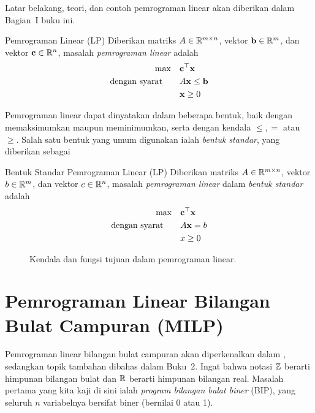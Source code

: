 Latar belakang, teori, dan contoh pemrograman linear akan diberikan dalam Bagian~I buku ini.
\begin{general}{Pemrograman Linear (LP)}{\polynomial}
\label{general:LP}
Diberikan matriks $A \in {\mathbb{R}}^{m\times n}$, vektor $\mathbf{b} \in {\mathbb{R}}^m$, dan vektor $\mathbf{c} \in {\mathbb{R}}^n$, masalah \emph{pemrograman linear} adalah
\begin{equation}
\label{eq:LP}
\begin{split}
\max \quad & \mathbf{c}^\top \mathbf{x}\\
\mbox{dengan syarat}\quad  \quad & A\mathbf{x} \leq \mathbf{b}\\
& \mathbf{x} \geq 0
\end{split}
\end{equation}
\end{general}

Pemrograman linear dapat dinyatakan dalam beberapa bentuk, baik dengan memaksimumkan maupun meminimumkan, serta dengan kendala $\leq, =$ atau $\geq$. Salah satu bentuk yang umum digunakan ialah \emph{bentuk standar}, yang diberikan sebagai
\begin{general}{Bentuk Standar Pemrograman Linear (LP)}{\polynomial}
Diberikan matriks $A \in {\mathbb{R}}^{m\times n}$, vektor $b \in {\mathbb{R}}^m$, dan vektor $c \in {\mathbb{R}}^n$, masalah \emph{pemrograman linear} dalam \emph{bentuk standar} adalah
\begin{equation}
\label{eq:standardLP}
\begin{split}
\max \quad & \mathbf{c}^\top \mathbf{x}\\
\mbox{dengan syarat}\quad  \quad & A\mathbf{x} = b\\
& x \geq 0
\end{split}
\end{equation}
\end{general}

\begin{figure}
\caption{Kendala dan fungsi tujuan dalam pemrograman linear.}
\end{figure}

\section{Pemrograman Linear Bilangan Bulat Campuran (MILP)}
\label{sec:intro-MILP}
Pemrograman linear bilangan bulat campuran akan diperkenalkan dalam \OOIntegerProgrammingReference, sedangkan topik tambahan dibahas dalam Buku~2.
Ingat bahwa notasi ${\mathbb{Z}}$ berarti himpunan bilangan bulat dan ${\mathbb{R}}$ berarti himpunan bilangan real. Masalah pertama yang kita kaji di sini ialah \emph{program bilangan bulat biner} (BIP), yang seluruh $n$ variabelnya bersifat biner (bernilai 0 atau 1).

